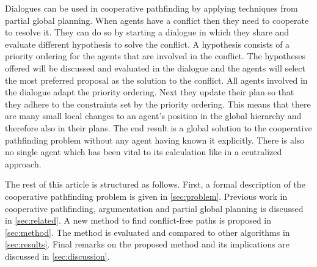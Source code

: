 Dialogues can be used in cooperative pathfinding by applying techniques from
partial global planning. When agents have a conflict then they need to
cooperate to resolve it. They can do so by starting a dialogue in which
they share and evaluate different hypothesis to solve the conflict. A
hypothesis consists of a priority ordering for the agents that are involved in
the conflict. The hypotheses offered will be discussed and evaluated in the
dialogue and the agents will select the most preferred proposal as the solution 
to the conflict. All agents involved in the dialogue adapt the priority 
ordering. Next they update their plan so that they adhere to the constraints 
set by the priority ordering. This means that there are many small local 
changes to an agent's position in the global hierarchy and therefore also in 
their plans. The end result is a global solution to the cooperative pathfinding 
problem without any agent having known it explicitly. There is also no single 
agent which has been vital to its calculation like in a centralized approach.

The rest of this article is structured as follows. First, a formal description
of the cooperative pathfinding problem is given in \autoref{sec:problem}.
Previous work in cooperative pathfinding, argumentation and partial global
planning is discussed in \autoref{sec:related}. A new method to find
conflict-free paths is proposed in \autoref{sec:method}. The method is
evaluated and compared to other algorithms in \autoref{sec:results}. Final
remarks on the proposed method and its implications are discussed in
\autoref{sec:discussion}.
